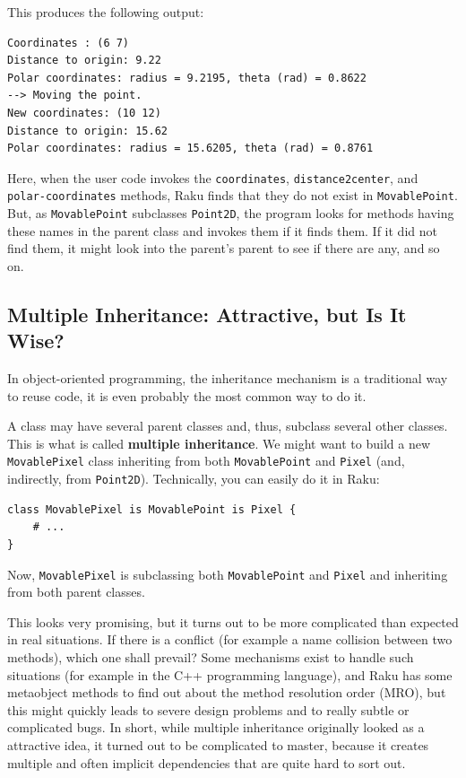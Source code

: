 This produces the following output:

\begin{verbatim}
Coordinates : (6 7)
Distance to origin: 9.22
Polar coordinates: radius = 9.2195, theta (rad) = 0.8622
--> Moving the point.
New coordinates: (10 12)
Distance to origin: 15.62
Polar coordinates: radius = 15.6205, theta (rad) = 0.8761
\end{verbatim}

Here, when the user code invokes the {\tt coordinates}, 
{\tt distance2center}, and {\tt polar-coordinates} methods, 
Raku finds that they do not exist in {\tt MovablePoint}. But,  
as \verb'MovablePoint' subclasses {\tt Point2D}, the program 
looks for methods having these names in the parent class and 
invokes them if it finds them. 	If it did not find them, it 
might look into the parent's parent to see if there are any, and 
so on.


\subsection{Multiple Inheritance: Attractive, but Is It Wise?}

In object-oriented programming, the inheritance mechanism is 
a traditional way to reuse code, it is even probably the most 
common way to do it. 

A class may have several parent classes and, thus, subclass 
several other classes. This is what is called {\bf multiple 
inheritance}. We might want to build a new {\tt MovablePixel} 
class inheriting from both {\tt MovablePoint} and {\tt Pixel} 
(and, indirectly, from {\tt Point2D}). Technically, you can 
easily do it in Raku:

\begin{verbatim}
class MovablePixel is MovablePoint is Pixel {
    # ...
}
\end{verbatim}

Now, {\tt MovablePixel} is subclassing both 
{\tt MovablePoint} and {\tt Pixel} and inheriting 
from both parent classes.

This looks very promising, but it turns out to be more 
complicated than expected in real situations. If there is a 
conflict (for example a name collision between two methods), 
which one shall prevail? Some mechanisms exist to 
handle such situations (for example in the C++ programming 
language), and Raku has some metaobject methods to find out 
about the method resolution order (MRO), but this 
might quickly leads to severe design 
problems and to really subtle or complicated bugs. In 
short, while multiple inheritance originally looked as a 
attractive idea, it turned out to be complicated to master, 
because it creates multiple and often implicit dependencies 
that are quite hard to sort out.

